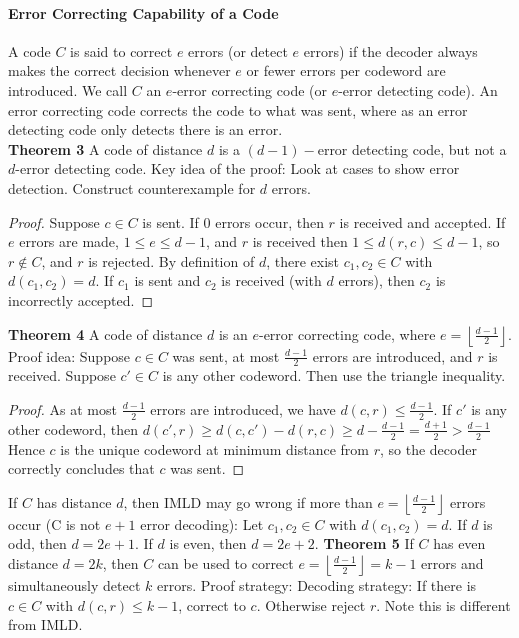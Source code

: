 \documentclass[10pt,letter]{article}
\theoremstyle{plain}
\theoremstyle{definition}
\begin{document}
\paragraph{Error Correcting Capability of a Code}
A code $C$ is said to correct $e$ errors (or detect $e$ errors) if the decoder always makes the correct decision whenever $e$ or fewer errors per codeword are introduced. We call $C$ an $e$-error correcting code (or $e$-error detecting code). An error correcting code corrects the code to what was sent, where as an error detecting code only detects there is an error.  \\ 
\textbf{Theorem 3}
A code of distance $d$ is a $(d-1)-$error detecting code, but not a $d$-error detecting code. Key idea of the proof: Look at cases to show error detection. Construct counterexample for $d$ errors. \\ 
\begin{proof}
     Suppose $c\in C$ is sent. If $0$ errors occur, then $r$ is received and accepted. If $e$ errors are made, $1\leq e\leq d-1$, and $r$ is received then $1\leq d(r,c)\leq d-1$, so $r\notin C$, and $r$ is rejected. By definition of $d$, there exist $c_1,c_2\in C$ with $d(c_1,c_2)=d$. If $c_1$ is sent and $c_2$ is received (with $d$ errors), then $c_2$ is incorrectly accepted. 
\end{proof}
\textbf{Theorem 4}
A code of distance $d$ is an $e$-error correcting code, where $e=\left\lfloor\frac{d-1}{2}\right\rfloor$. Proof idea: Suppose $c\in C$ was sent, at most $\frac{d-1}{2}$ errors are introduced, and $r$ is received. Suppose $c'\in C$ is any other codeword. Then use the triangle inequality.
\begin{proof}
     As at most $\frac{d-1}{2}$ errors are introduced, we have $d(c,r)\leq\frac{d-1}{2}$. If $c'$ is any other codeword, then $d(c',r)\geq d(c,c')-d(r,c)\geq d-\frac{d-1}{2}=\frac{d+1}{2}>\frac{d-1}{2}$ Hence $c$ is the unique codeword at minimum distance from $r$, so the decoder correctly concludes that $c$ was sent. 
\end{proof}
If $C$ has distance $d$, then IMLD may go wrong if more than $e=\left\lfloor\frac{d-1}{2}\right\rfloor$ errors occur (C is not $e+1$ error decoding): Let $c_1,c_2\in C$ with $d(c_1,c_2)=d$. If $d$ is odd, then $d=2e+1$. If $d$ is even, then $d=2e+2$. 
\textbf{Theorem 5} If $C$ has even distance $d=2k$, then $C$ can be used to correct $e=\left\lfloor\frac{d-1}{2}\right\rfloor=k-1$ errors and simultaneously detect $k$ errors. Proof strategy: Decoding strategy: If there is $c\in C$ with $d(c,r)\leq k-1$, correct to $c$. Otherwise reject $r$. Note this is different from IMLD.
\end{document}
